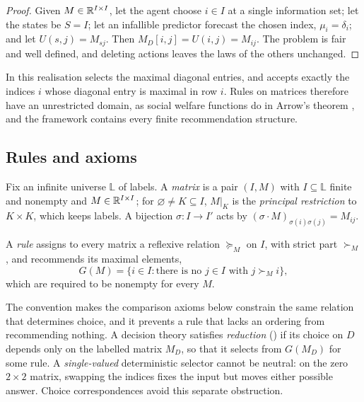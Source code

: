 \begin{proof}
Given $M\in\mathbb{R}^{I\times I}$, let the agent choose $i\in I$ at a single information set; let the states
be $S=I$; let an infallible predictor forecast the chosen index, $\mu_i=\delta_i$; and let
$U(s,j)=M_{sj}$. Then $M_D[i,j]=U(i,j)=M_{ij}$. The problem is fair and well defined, and deleting
actions leaves the laws of the others unchanged.
\end{proof}

In this realisation  selects the maximal diagonal entries, and  accepts exactly the
indices $i$ whose diagonal entry is maximal in row $i$. Rules on matrices therefore have an
unrestricted domain, as social welfare functions do in Arrow's theorem
\autocite{arrow1951}, and the framework contains every finite recommendation structure.

\subsection{Rules and axioms}

Fix an infinite universe $\mathbb L$ of labels. A \emph{matrix} is a pair $(I,M)$ with $I\subseteq\mathbb L$
finite and nonempty and $M\in\mathbb{R}^{I\times I}$; for $\varnothing\ne K\subseteq I$, $M|_K$ is the
\emph{principal restriction} to $K\times K$, which keeps labels. A bijection $\sigma\colon I\to I'$ acts by
$(\sigma\cdot M)_{\sigma(i)\sigma(j)}=M_{ij}$.

\begin{definition}[Rule]\label{def:rule}
A \emph{rule} assigns to every matrix a reflexive relation $\succeq_M$ on $I$, with strict part
$\succ_M$, and recommends its maximal elements,
\[
  G(M)=\{i\in I:\text{there is no }j\in I\text{ with }j\succ_M i\},
\]
which are required to be nonempty for every $M$.
\end{definition}

The convention makes the comparison axioms below constrain the same relation that determines
choice, and it prevents a rule that lacks an ordering from recommending nothing. A decision theory
satisfies \emph{reduction} () if its choice on $D$ depends only on the labelled matrix $M_D$,
so that it selects from $G(M_D)$ for some rule. A \emph{single-valued} deterministic selector
cannot be neutral: on the zero $2\times2$ matrix, swapping the indices fixes the input but moves
either possible answer. Choice correspondences avoid this separate obstruction.


